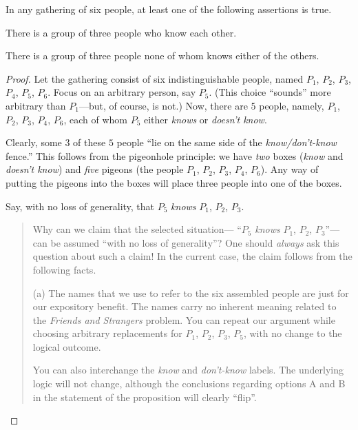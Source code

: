 \begin{prop}
\label{thm:triangle-cotriangles}
In any gathering of six people, at least one of the following
assertions is true.

There is a group of three people who know each other.

There is a group of three people none of whom knows either of the
others.
\end{prop}

\begin{proof}
Let the gathering consist of six indistinguishable people, named
$P_1$, $P_2$, $P_3$, $P_4$, $P_5$, $P_6$.  Focus on an arbitrary
person, say $P_5$.  (This choice ``sounds'' more arbitrary than
$P_1$---but, of course, is not.)  Now, there are $5$ people, namely,
$P_1$, $P_2$, $P_3$, $P_4$, $P_6$, each of whom $P_5$ either {\em
  knows} or {\em doesn't know}.

Clearly, some $3$ of these $5$ people ``lie on the same side of the
{\em know/don't-know} fence.''  This follows from the pigeonhole
principle: we have {\em two} boxes ({\em know} and {\em doesn't know})
and {\em five} pigeons (the people $P_1$, $P_2$, $P_3$, $P_4$, $P_6$).
Any way of putting the pigeons into the boxes will place three people
into one of the boxes.

Say, with no loss of generality, that $P_5$ {\em knows} $P_1$, $P_2$,
$P_3$.
\begin{quote}
Why can we claim that the selected situation--- ``$P_5$ {\em knows}
$P_1$, $P_2$, $P_3$''---can be assumed ``with no loss of generality''?
One should {\em always} ask this question about such a claim!  In the
current case, the claim follows from the following facts.

(a) The names that we use to refer to the six assembled people are
just for our expository benefit.  The names carry no inherent meaning
related to the {\it Friends and Strangers} problem.  You can repeat
our argument while choosing arbitrary replacements for $P_1$, $P_2$,
$P_3$, $P_5$, with no change to the logical outcome.

You can also interchange the {\em know} and {\em don't-know} labels.
The underlying logic will not change, although the conclusions
regarding options A and B in the statement of the proposition will
clearly ``flip''.
\end{quote}


\end{proof}
